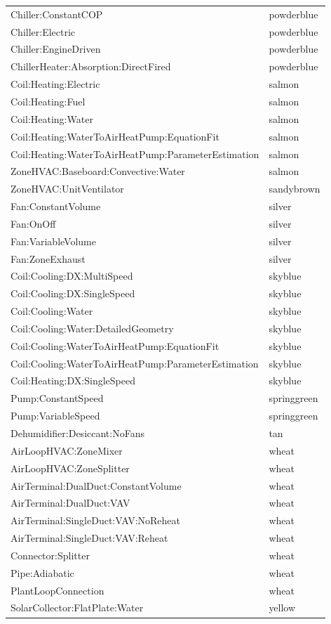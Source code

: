 \begin{longtable}[c]{@{}ll@{}}
Chiller:ConstantCOP & powderblue \tabularnewline
Chiller:Electric & powderblue \tabularnewline
Chiller:EngineDriven & powderblue \tabularnewline
ChillerHeater:Absorption:DirectFired & powderblue \tabularnewline
Coil:Heating:Electric & salmon \tabularnewline
Coil:Heating:Fuel & salmon \tabularnewline
Coil:Heating:Water & salmon \tabularnewline
Coil:Heating:WaterToAirHeatPump:EquationFit & salmon \tabularnewline
Coil:Heating:WaterToAirHeatPump:ParameterEstimation & salmon \tabularnewline
ZoneHVAC:Baseboard:Convective:Water & salmon \tabularnewline
ZoneHVAC:UnitVentilator & sandybrown \tabularnewline
Fan:ConstantVolume & silver \tabularnewline
Fan:OnOff & silver \tabularnewline
Fan:VariableVolume & silver \tabularnewline
Fan:ZoneExhaust & silver \tabularnewline
Coil:Cooling:DX:MultiSpeed & skyblue \tabularnewline
Coil:Cooling:DX:SingleSpeed & skyblue \tabularnewline
Coil:Cooling:Water & skyblue \tabularnewline
Coil:Cooling:Water:DetailedGeometry & skyblue \tabularnewline
Coil:Cooling:WaterToAirHeatPump:EquationFit & skyblue \tabularnewline
Coil:Cooling:WaterToAirHeatPump:ParameterEstimation & skyblue \tabularnewline
Coil:Heating:DX:SingleSpeed & skyblue \tabularnewline
Pump:ConstantSpeed & springgreen \tabularnewline
Pump:VariableSpeed & springgreen \tabularnewline
Dehumidifier:Desiccant:NoFans & tan \tabularnewline
AirLoopHVAC:ZoneMixer & wheat \tabularnewline
AirLoopHVAC:ZoneSplitter & wheat \tabularnewline
AirTerminal:DualDuct:ConstantVolume & wheat \tabularnewline
AirTerminal:DualDuct:VAV & wheat \tabularnewline
AirTerminal:SingleDuct:VAV:NoReheat & wheat \tabularnewline
AirTerminal:SingleDuct:VAV:Reheat & wheat \tabularnewline
Connector:Splitter & wheat \tabularnewline
Pipe:Adiabatic & wheat \tabularnewline
PlantLoopConnection & wheat \tabularnewline
SolarCollector:FlatPlate:Water & yellow \tabularnewline
\bottomrule
\end{longtable}
